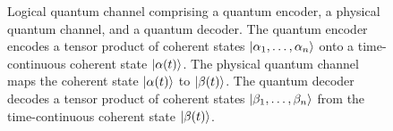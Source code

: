 \begin{figure}[htb]
	\centering
	
	\caption{Logical quantum channel comprising a quantum encoder, a physical quantum channel, and a quantum decoder. The quantum encoder encodes a tensor product of coherent states $\ket{\alpha_1,\dots,\alpha_n}$ onto a time-continuous coherent state $\ket{\alpha(t)}$. The physical quantum channel maps the coherent state $\ket{\alpha(t)}$ to $\ket{\beta(t)}$. The quantum decoder decodes a tensor product of coherent states $\ket{\beta_1,\dots,\beta_n}$ from the time-continuous coherent state $\ket{\beta(t)}$.}
\end{figure}